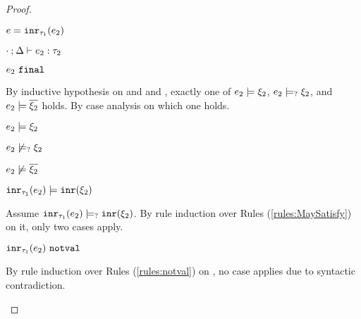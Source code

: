\begin{proof}
\begin{byCases}
\begin{byCases}
    \item[\text{(\ref{rule:TInr})}]
        \begin{pfsteps*}
        \item $e=\mathtt{inr}_{\tau_1}({e_2})$ 
        \item $\cdot \mathbin{;} \Delta \vdash e_2 : \tau_2$  
        \item $e_2 ~\mathtt{final}$  
        \end{pfsteps*}
        By inductive hypothesis on  and  and , exactly one of $e_2 \models \xi_2$, $e_2 \models_{?} \xi_2$, and $e_2 \models \overline{\xi_2}$ holds. By case analysis on which one holds.
        \begin{byCases}
        \item[\csatisfy{e_2}{\xi_2}]
            \begin{pfsteps*}
            \item $e_2 \models \xi_2$  
            \item $e_2 \not\models_{?} \xi_2$  
            \item $e_2 \not\models \overline{\xi_2}$  
            \item $\mathtt{inr}_{\tau_1}({e_2}) \models \mathtt{inr}(\xi_2)$ 
            \end{pfsteps*}
            Assume $\mathtt{inr}_{\tau_1}({e_2}) \models_{?} \mathtt{inr}(\xi_2)$. By rule induction over Rules (\ref{rules:MaySatisfy}) on it, only two cases apply.
            \begin{byCases}
            \item[\text{(\ref{rule:CMSNotVal})}]
                \begin{pfsteps*}
                \item $\mathtt{inr}_{\tau_1}({e_2}) ~\mathtt{notval}$  
                \end{pfsteps*}
                By rule induction over Rules (\ref{rules:notval}) on , no case applies due to syntactic contradiction.
            \item[\text{(\ref{rule:CMSInr})}]
                \begin{pfsteps*}

\end{pfsteps*}
\end{byCases}
\end{byCases}
\end{byCases}
\end{byCases}
\end{proof}
